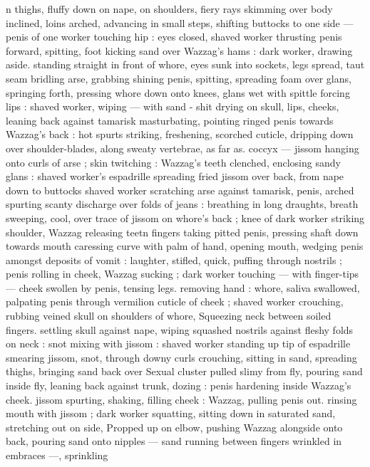 n thighs, fluffy down on nape, on shoulders, fiery rays skimming 
over body inclined, loins arched, advancing in small steps, shifting 
buttocks to one side --- penis of one worker touching hip : eyes 
closed, shaved worker thrusting penis forward, spitting, foot kicking 
sand over Wazzag's hams : dark worker, drawing aside. standing 
straight in front of whore, eyes sunk into sockets, legs spread, taut 
seam bridling arse, grabbing shining penis, spitting, spreading foam 
over glans, springing forth, pressing whore down onto knees, glans 
wet with spittle forcing lips : shaved worker, wiping --- with sand - 
shit drying on skull, lips, cheeks, leaning back against tamarisk 
masturbating, pointing ringed penis towards Wazzag's back : hot 
spurts striking, freshening, scorched cuticle, dripping down over 
shoulder-blades, along sweaty vertebrae, as far as. coccyx --- jissom 
hanging onto curls of arse ; skin twitching : Wazzag's teeth 
clenched, enclosing sandy glans : shaved worker's espadrille 
spreading fried jissom over back, from nape down to buttocks 
shaved worker scratching arse against tamarisk, penis, arched 
spurting scanty discharge over folds of jeans : breathing in long 
draughts, breath sweeping, cool, over trace of jissom on whore's 
back ; knee of dark worker striking shoulder, Wazzag releasing teetn 
fingers taking pitted penis, pressing shaft down towards mouth 
caressing curve with palm of hand, opening mouth, wedging penis 
amongst deposits of vomit : laughter, stifled, quick, puffing through 
nostrils ; penis rolling in cheek, Wazzag sucking ; dark worker 
touching --- with finger-tips --- cheek swollen by penis, tensing legs. 
removing hand : whore, saliva swallowed, palpating penis through 
vermilion cuticle of cheek ; shaved worker crouching, rubbing veined 
skull on shoulders of whore, Squeezing neck between soiled fingers. 
settling skull against nape, wiping squashed nostrils against fleshy 
folds on neck : snot mixing with jissom : shaved worker standing up 
tip of espadrille smearing jissom, snot, through downy curls 
crouching, sitting in sand, spreading thighs, bringing sand back over 
Sexual cluster pulled slimy from fly, pouring sand inside fly, leaning 
back against trunk, dozing : penis hardening inside Wazzag's cheek. 
jissom spurting, shaking, filling cheek : Wazzag, pulling penis out. 
rinsing mouth with jissom ; dark worker squatting, sitting down in 
saturated sand, stretching out on side, Propped up on elbow, 
pushing Wazzag alongside onto back, pouring sand onto nipples --- 
sand running between fingers wrinkled in embraces ---, sprinkling 
